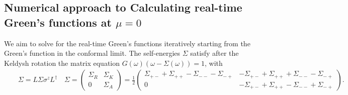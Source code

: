 \documentclass[twocolumn,floatfix,superscriptaddress]{revtex4-1}
\begin{document}
\begin{widetext}
 \section{Numerical approach to Calculating real-time Green's functions at $\mu=0$}
 \label{numerics_green}
We aim to solve for the real-time Green's functions iteratively starting from the Green's function in the conformal limit.
The self-energies $\Sigma$   satisfy after the Keldysh rotation the matrix equation $G(\omega)(\omega-\Sigma(\omega))=1$, with
\begin{eqnarray}
\label{sigma_keldysh}
&&\Sigma=L\Sigma \sigma^z L^\dagger\quad \Sigma=\left (\begin{array}{cc} \Sigma_R & \Sigma _K\\ 0 &\Sigma_A\end{array}\right)=\frac{1}{2}\left (\begin{array}{cc} \Sigma_{+-}+\Sigma_{++}-\Sigma_{--}-\Sigma_{-+} & -\Sigma_{+-}+\Sigma_{++}+\Sigma_{--}-\Sigma_{-+} \\ 0 &-\Sigma_{+-}+\Sigma_{++}-\Sigma_{--}+\Sigma_{-+}\end{array}\right).
\end{eqnarray}



\end{widetext}
\end{document}
